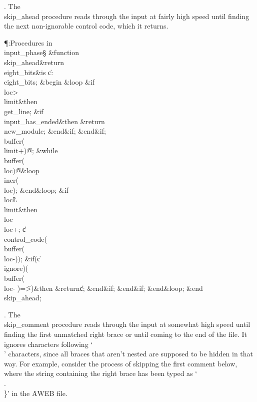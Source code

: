 . The \\{skip\_ahead} procedure reads through the input at fairly high
speed
until finding the next non-ignorable control code, which it returns.

\Y\P\?\4:Procedures in \\{input\_phase}\X\mathrel{+}\S\?\6
\&{function}\8\1\\{skip\_ahead}\?\8\&{return}\?\8\\{eight\_bits}\2\8\&{is}\8%
\1\6
\|c\?:\?\\{eight\_bits};\6
\4\&{begin}\6
\1\&{loop}\6
\&{if}\1\1\8\\{loc}\?>\?\\{limit}\2\8\&{then}\6
\\{get\_line};\6
\&{if}\1\1\8\\{input\_has\_ended}\2\8\&{then}\6
\?\&{return}\?\8\\{new\_module};\2\6
\&{end}\8\2\&{if}\1;\2\6
\&{end}\8\2\&{if}\1;\6
\\{buffer}\?\1(\?\\{limit}\?+\?\2)\K\?\H{@};\6
\1\&{while}\8\\{buffer}\?\1(\?\\{loc}\?\2)\I\?\H{@}\8\&{loop}\6
\\{incr}\?\1(\?\\{loc}\?\2)\?;\2\6
\&{end}\8\&{loop};\6
\&{if}\1\1\8\\{loc}\?\L\?\\{limit}\2\8\&{then}\6
\\{loc}\?\K\?\\{loc}\?+;\5
\|c\?\K\?\\{control\_code}\?\1(\?\\{buffer}\?\1(\?\\{loc}\?-\?\2)\2)\?;\6
\&{if}\1\1\?\8\1(\?\|c\?\I\?\\{ignore}\?\2)\V\1(\?\\{buffer}\?\1(\?\\{loc}\?-%
\?\2)=\?\H{>}\?\2)\?\2\8\&{then}\6
\?\&{return}\?\8\|c;\2\6
\&{end}\8\2\&{if}\1;\2\6
\&{end}\8\2\&{if}\1;\2\6
\&{end}\8\&{loop};\2\6
\&{end}\8\\{skip\_ahead};\par
\fi

. The \\{skip\_comment} procedure reads through the input at somewhat high
speed
until finding the first unmatched right brace or until coming to the end
of the file. It ignores characters following `\.\\' characters, since all
braces that aren't nested are supposed to be hidden in that way. For
example, consider the process of skipping the first comment below,
where the string containing the right brace has been typed as \.{`\\.\\\}'}
in the \.{AWEB} file.

